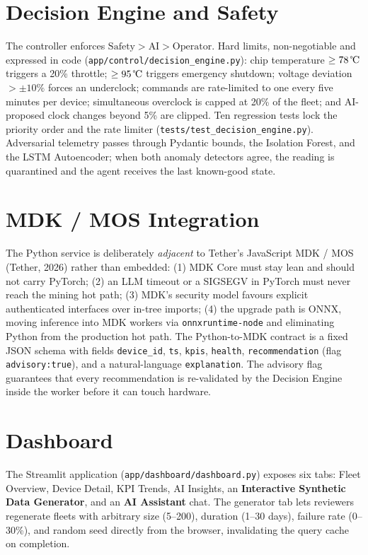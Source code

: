 \documentclass[11pt,a4paper]{article}
\begin{document}
\section{Decision Engine and Safety}
The controller enforces
$\text{Safety} > \text{AI} > \text{Operator}$. Hard limits, non-negotiable
and expressed in code (\texttt{app/control/decision\_engine.py}): chip
temperature $\geq 78\,\text{\textcelsius}$ triggers a 20\% throttle;
$\geq 95\,\text{\textcelsius}$ triggers emergency shutdown; voltage
deviation $> \pm 10\%$ forces an underclock; commands are rate-limited to
one every five minutes per device; simultaneous overclock is capped at 20\%
of the fleet; and AI-proposed clock changes beyond 5\% are clipped. Ten
regression tests lock the priority order and the rate limiter
(\texttt{tests/test\_decision\_engine.py}). Adversarial telemetry passes
through Pydantic bounds, the Isolation Forest, and the LSTM Autoencoder;
when both anomaly detectors agree, the reading is quarantined and the
agent receives the last known-good state.

\section{MDK / MOS Integration}
The Python service is deliberately \emph{adjacent} to Tether's JavaScript
MDK / MOS (Tether, 2026) rather than embedded: (1) MDK Core must stay lean
and should not carry PyTorch; (2) an LLM timeout or a SIGSEGV in PyTorch
must never reach the mining hot path; (3) MDK's security model favours
explicit authenticated interfaces over in-tree imports; (4) the upgrade
path is ONNX, moving inference into MDK workers via
\texttt{onnxruntime-node} and eliminating Python from the production hot
path. The Python-to-MDK contract is a fixed JSON schema with fields
\texttt{device\_id}, \texttt{ts}, \texttt{kpis}, \texttt{health},
\texttt{recommendation} (flag \texttt{advisory:true}), and a natural-language
\texttt{explanation}. The advisory flag guarantees that every recommendation
is re-validated by the Decision Engine inside the worker before it can touch
hardware.

\section{Dashboard}
The Streamlit application (\texttt{app/dashboard/dashboard.py}) exposes six
tabs: Fleet Overview, Device Detail, KPI Trends, AI Insights, an
\textbf{Interactive Synthetic Data Generator}, and an \textbf{AI Assistant}
chat. The generator tab lets reviewers regenerate fleets with arbitrary
size (5--200), duration (1--30 days), failure rate (0--30\%), and random
seed directly from the browser, invalidating the query cache on completion.
\end{document}

